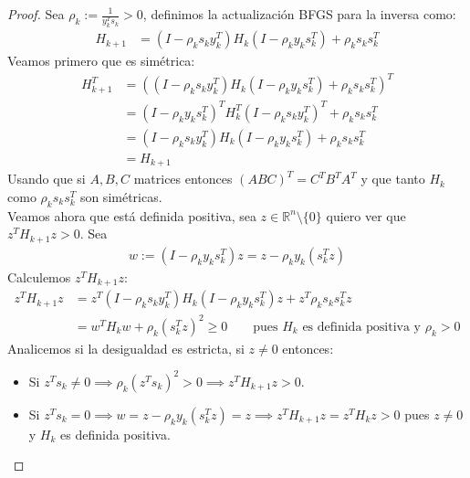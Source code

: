 \documentclass{article}
\newcommand{\R}{\mathbb{R}}
\begin{document}
\begin{proof}
    Sea \( \rho_k := \frac{1}{y_k^T s_k} > 0 \), definimos la actualización BFGS para la inversa como: \begin{align*}
        H_{k+1} & = \left(I - \rho_k s_k y_k^T \right) H_k \left(I - \rho_k y_k s_k^T \right) + \rho_k s_k s_k^T
    \end{align*}
    Veamos primero que es simétrica: \begin{align*}
        H_{k+1}^T & = {\left( \left(I - \rho_k s_k y_k^T \right) H_k \left(I - \rho_k y_k s_k^T \right) + \rho_k s_k s_k^T \right)}^T \\
                  & = {\left(I - \rho_k y_k s_k^T \right)}^T H_k^T {\left(I - \rho_k s_k y_k^T \right)}^T + \rho_k s_k s_k^T          \\
                  & = \left(I - \rho_k s_k y_k^T \right) H_k \left(I - \rho_k y_k s_k^T \right) + \rho_k s_k s_k^T                    \\
                  & = H_{k+1}
    \end{align*}
    Usando que si \( A, B, C \) matrices entonces \( {(ABC)}^T = C^T B^T A^T \) y que tanto \( H_k \) como \( \rho_k s_k s_k^T \) son simétricas. \\
    Veamos ahora que está definida positiva, sea \( z \in \R^n \setminus \{ 0 \} \) quiero ver que \( z^T H_{k+1} z > 0 \). Sea \begin{align*}
        w := (I - \rho_k y_k s_k^T) z = z - \rho_k y_k (s_k^T z)
    \end{align*}
    Calculemos \( z^T H_{k+1} z \): \begin{align*}
        z^T H_{k+1} z & = z^T \left( I - \rho_k s_k y_k^T \right) H_k \left(I - \rho_k y_k s_k^T \right) z + z^T \rho_k s_k s_k^T z  \\
                      & = w^T H_k w + {\rho_k (s_k^T z)}^2 \geq 0 \qquad \text{pues } H_k \text{ es definida positiva y } \rho_k > 0
    \end{align*}
    Analicemos si la desigualdad es estricta, si \( z \neq 0 \) entonces: \begin{itemize}
        \item Si \( z^T s_k \neq 0 \implies \rho_k {(z^T s_k)}^2 > 0 \implies z^T H_{k+1} z > 0 \).
        \item Si \( z^T s_k = 0 \implies w = z - \rho_k y_k (s_k^T z) = z \implies z^T H_{k+1} z = z^T H_k z > 0 \) pues \( z \neq 0 \) y \( H_k \) es definida positiva.
    \end{itemize}
\end{proof}
\vspace{0.25in}
\end{document}
